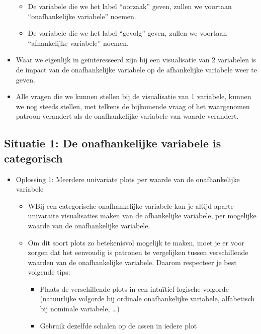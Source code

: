 \documentclass[]{memoir}
\providecommand{\tightlist}{%
  \setlength{\itemsep}{0pt}\setlength{\parskip}{0pt}}
\begin{document}
\begin{itemize}
  \begin{itemize}
  \tightlist
  \item
    De variabele die we het label ``oorzaak'' geven, zullen we voortaan
    ``onafhankelijke variabele'' noemen.
  \item
    De variabele die we het label ``gevolg'' geven, zullen we voortaan
    ``afhankelijke variabele'' noemen.
  \end{itemize}
\item
  Waar we eigenlijk in geïnteresseerd zijn bij een visualisatie van 2
  variabelen is de impact van de onafhankelijke variabele op de
  afhankelijke variabele weer te geven.
\item
  Alle vragen die we kunnen stellen bij de visualisatie van 1 variabele,
  kunnen we nog steeds stellen, met telkens de bijkomende vraag of het
  waargenomen patroon verandert als de onafhankelijke variabele van
  waarde verandert.
\end{itemize}

\subsection{Situatie 1: De onafhankelijke variabele is
categorisch}\label{situatie-1-de-onafhankelijke-variabele-is-categorisch}

\begin{itemize}
\tightlist
\item
  Oplossing 1: Meerdere univariate plots per waarde van de
  onafhankelijke variabele

  \begin{itemize}
  \tightlist
  \item
    WBij een categorische onafhankelijke variabele kan je altijd aparte
    univaraite visualisaties maken van de afhankelijke variabele, per
    mogelijke waarde van de onafhankelijke variabele.
  \item
    Om dit soort plots zo betekenisvol mogelijk te maken, moet je er
    voor zorgen dat het eenvoudig is patronen te vergelijken tussen
    verschillende waarden van de onafhankelijke variabele. Daarom
    respecteer je best volgende tips:

    \begin{itemize}
    \tightlist
    \item
      Plaats de verschillende plots in een intuïtief logische volgorde
      (natuurlijke volgorde bij ordinale onafhankelijke variabele,
      alfabetisch bij nominale variabele, \ldots{})
    \item
      Gebruik dezelfde schalen op de assen in iedere plot
    \end{itemize}
  \end{itemize}
\end{itemize}
\end{document}
